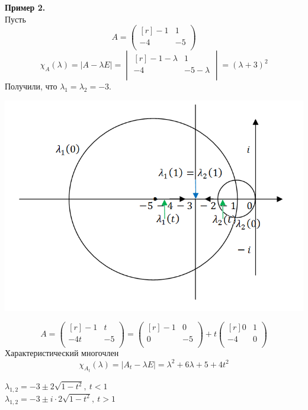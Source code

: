 \textbf{Пример 2.}\\
Пусть 
\[A=\begin{pmatrix}[r]
-1 & 1 \\
-4 & -5 \\
\end{pmatrix}\]
\[\chi_A(\lambda)=|A-\lambda E|=\begin{vmatrix}[r]
-1-\lambda & 1 \\
-4 & -5-\lambda \\
\end{vmatrix}=(\lambda +3)^2\]
Получили, что $\lambda_1=\lambda_2=-3$.
\begin{center}
    \includegraphics[scale=0.8]{l9_5.png}
\end{center}
\[A=\begin{pmatrix}[r]
-1 & t \\
-4t & -5 \\
\end{pmatrix}=\begin{pmatrix}[r]
-1 & 0 \\
0 & -5 \\
\end{pmatrix}+ t\begin{pmatrix}[r]
0 & 1 \\
-4 & 0 \\
\end{pmatrix}\]
Характеристический многочлен $$\chi_{A_t}(\lambda)=|A_t-\lambda E|=\lambda^2+6\lambda+5+4t^2$$
\begin{center}
    $\lambda_{1,2}=-3\pm 2\sqrt{1-t^2},~t<1$\\
    $\lambda_{1,2}=-3\pm i\cdot 2\sqrt{1-t^2},~t>1$
\end{center}
